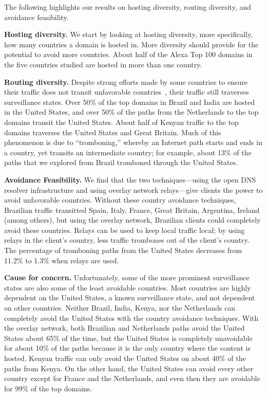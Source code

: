The following highlights our results on hosting diversity, routing diversity, and avoidance feasibility.

{\bf Hosting diversity.} We start by looking at hosting diversity, more specifically, how many
countries a domain is hosted in.  More diversity should provide for the
potential to avoid more countries.  About half of the
Alexa Top 100 domains in the five countries studied are hosted in more
than one country. 

{\bf Routing diversity.} Despite strong efforts made by some countries to ensure their traffic does 
not transit unfavorable countries~\cite{brazil_history, brazil_break_from_US, brazil_conference,
  brazil_conference2, brazil_human_rights},
their traffic still traverses surveillance states.  Over 50\% of the top domains in
Brazil and India are hosted in the United States, and over 50\% of the
paths from the Netherlands to the top domains transit the
United States.  About half of Kenyan traffic to the top domains traverses the United States
and Great Britain.  Much of this phenomenon is
due to ``tromboning,'' whereby an Internet path starts and ends in a
country, yet transits an intermediate country; for example, about 13\%
of the paths that we explored from Brazil tromboned through the United States. 

{\bf Avoidance Feasibility.} We find that the two techniques---using the open DNS resolver 
infrastructure and using overlay network relays---give clients the power to avoid unfavorable countries.  Without these
country avoidance techniques, Brazilian traffic transitted Spain, Italy,
France, Great Britain, Argentina, Ireland (among others), but using the
overlay network, Brazilian clients could completely avoid these
countries.  Relays can be used to
keep local traffic local; by using relays in the client's country, less
traffic trombones out of the client's country.  The percentage of tromboning paths
from the United States decreases from 11.2\% to 1.3\% when
relays are used.   

{\bf Cause for concern.} Unfortunately, some of the more prominent surveillance states are also
some of the least avoidable countries.  Most countries are
highly dependent on the United States, a known surveillance state, and
not dependent on other countries.  Neither Brazil, India, Kenya, nor the
Netherlands can completely avoid the United States with the country
avoidance techniques.  With the overlay network, both Brazilian and
Netherlands paths avoid the United States about 65\% of the time, but
the United States is completely unavoidable for about 10\% of the paths
because it is the only country where the content is hosted.  Kenyan traffic can
only avoid the United States on about 40\% of the paths from Kenya.  On the other hand, the United States can avoid
every other country except for France and the Netherlands, and even then
they are avoidable for 99\% of the top domains. 

